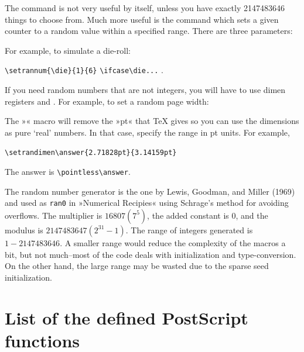 \documentclass[fontsize=11pt,english,BCOR=10mm,DIV=12,bibliography=totoc,parskip=false,headings=small,
    headinclude=false,footinclude=false,oneside]{pst-doc}
\begin{document}
The  command is not very useful by itself, unless you
have exactly 2147483646 things to choose from.  Much more useful
is the  command which sets a given counter to a random
value within a specified range.  There are three parameters:


For example, to
simulate a die-roll: 

\verb|\setrannum{\die}{1}{6}| \verb|\ifcase\die...| .

If you need random numbers that are not integers, you will have to
use dimen registers and .  For example, to set a random
page width: 

 

 The »« macro
will remove the »pt« that TeX gives so you can use the dimensions
as pure `real' numbers.  In that case, specify the range in pt units.
For example,

  \verb|\setrandimen\answer{2.71828pt}{3.14159pt}|

  The answer is \verb|\pointless\answer|.

The random number generator is the one by Lewis, Goodman, and Miller
(1969) and used as \texttt{ran0} in »Numerical Recipies« using Schrage's
method for avoiding overflows.  The multiplier is $16807 (7^5)$, the
added constant is 0, and the modulus is $2147483647 (2^{31}-1)$.  The
range of integers generated is $1 - 2147483646$.  A smaller range would
reduce the complexity of the macros a bit, but not much--most of the
code deals with initialization and type-conversion.  On the other hand,
the large range may be wasted due to the sparse seed initialization.



\section{List of the defined PostScript functions}
\end{document}
